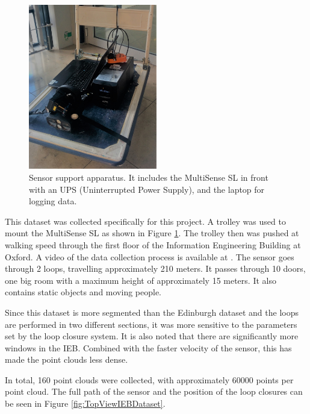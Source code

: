 \documentclass[11pt]{article}
\begin{document}
	\begin{figure}
		\centering
		\includegraphics[width=0.5\textwidth]{MountLiDAR}
		\caption[t]{Sensor support apparatus. It includes the MultiSense SL in front with an UPS (Uninterrupted Power Supply), and the laptop for logging data.}
		\label{fig:Mount}
	\end{figure}

This dataset was collected specifically for this project. A trolley was used to mount the MultiSense SL as shown in Figure \ref{fig:Mount}. The trolley then was pushed at walking speed through the first floor of the Information Engineering Building at Oxford. A video of the data collection process is available at \cite{me}. The sensor goes through 2 loops, travelling approximately 210 meters. It passes through 10 doors, one big room with a maximum height of approximately 15 meters. It also contains static objects and moving people.
	
Since this dataset is more segmented than the Edinburgh dataset and the loops are performed in two different sections, it was more sensitive to the parameters set by the loop closure system. It is also noted that there are significantly more windows in the IEB. Combined with the faster velocity of the sensor, this has made the point clouds less dense. 
	
In total, 160 point clouds were collected, with approximately 60000 points per point cloud. The full path of the sensor and the position of the loop closures can be seen in Figure \ref{fig:TopViewIEBDataset}.
\end{document}
